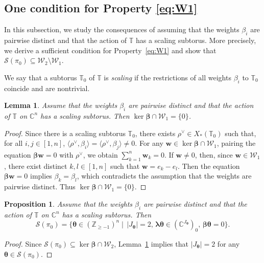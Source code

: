\documentclass[11pt]{article}
\newcommand{\bbeta}{\boldsymbol{\beta}}
\newcommand{\blambda}{\boldsymbol{\lambda}}
\newcommand{\btheta}{{\boldsymbol{\theta}}}
\newcommand{\bw}{\mathbf{w}}
\newtheorem{lemma}[theorem]{Lemma}%
\newtheorem{proposition}[theorem]{Proposition}%
\theoremstyle{definition}\newtheorem{definition}[theorem]{Definition}
\theoremstyle{definition}\newtheorem{remark}[theorem]{Remark}
\theoremstyle{remark}
\numberwithin{equation}{section}
\begin{document}
\subsection{\texorpdfstring{One condition for Property \eqref{eq:W1}}{One condition for Property W1}}\label{s:W1_general}
In this subsection, we study the consequences of assuming that the weights $\beta_i$ are pairwise distinct and that the action of $\mathbb T$ has a scaling subtorus. More precisely, we derive a sufficient condition for Property~\eqref{eq:W1} and show that $\mathcal{S}(\pi_0) \subseteq \mathcal{W}_2\setminus \mathcal{W}_1$.

We say that a subtorus $\mathbb{T}_0$ of $\mathbb{T}$ is \emph{scaling} if the restrictions of all weights $\beta_i$ to $\mathbb{T}_0$ coincide and are nontrivial.

\begin{lemma}\label{l:T1}
    Assume that the weights $\beta_i$ are pairwise distinct and that the action of $\mathbb{T}$ on $\mathbb{C}^n$ has a scaling subtorus. Then $\ker\bbeta \cap \mathcal{W}_1 = \{0\}$.
\end{lemma}
\begin{proof}
    Since there is a scaling subtorus $\mathbb{T}_0$, there exists $\rho^\vee \in X_*(\mathbb{T}_0)$ such that, for all $i,j \in [1,n]$, $\langle \rho^\vee,\beta_i\rangle = \langle \rho^\vee,\beta_j\rangle \neq 0$. For any $\bw \in \ker \bbeta \cap \mathcal{W}_1$, pairing the equation $\bbeta \bw = 0$ with $\rho^\vee$, we obtain $\sum_{k=1}^n \bw_k = 0$. If $\bw \neq 0$, then, since $\bw \in \mathcal{W}_1$, there exist distinct $k,l \in [1,n]$ such that $\bw = e_k - e_l$. Then the equation $\bbeta \bw = 0$ implies $\beta_k = \beta_l$, which contradicts the assumption that the weights are pairwise distinct. Thus $\ker \bbeta \cap \mathcal{W}_1 = \{0\}$.
\end{proof}

\begin{proposition}\label{prop:SisLM}
     Assume that the weights $\beta_i$ are pairwise distinct and that the action of $\mathbb{T}$ on $\mathbb{C}^n$ has a scaling subtorus. Then
     \begin{equation}\label{eq:sw2}
        \mathcal{S}(\pi_0)  = \{\btheta \in (\mathbb{Z}_{\geq -1})^n\mid \,|J_{\btheta}|=2, \, \blambda \btheta \in (\mathbb{C}^{J_{\btheta}})_0, \, \bbeta 
        \btheta = 0\}.
     \end{equation}
\end{proposition}
\begin{proof}
    Since $\mathcal{S}(\pi_0) \subseteq \ker \bbeta \cap \mathcal{W}_2$, Lemma~\ref{l:T1} implies that $|J_{\btheta}| = 2$ for any $\btheta \in \mathcal{S}(\pi_0)$.
\end{proof}
\end{document}
